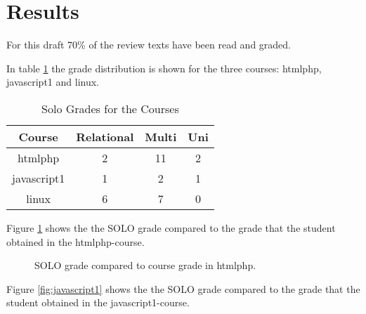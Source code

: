 \documentclass[twoside,twocolumn,a4paper,11pt,english]{article}
\begin{document}

\section{Results}

For this draft 70\% of the review texts have been read and graded.

In table \ref{table:solo} the grade distribution is shown for the three courses: htmlphp, javascript1 and linux.

\begin{table}[H]
\caption{Solo Grades for the Courses}
\centering
\begin{tabular}{c | c c c}
Course & Relational & Multi & Uni \\ [0.5ex] %
\hline
htmlphp & 2 & 11 & 2 \\
javascript1 & 1 & 2 & 1 \\
linux & 6 & 7 & 0 \\ [1ex]
\end{tabular}
\label{table:solo}
\end{table}

Figure \ref{fig:htmlphp} shows the the SOLO grade compared to the grade that the student obtained in the htmlphp-course.

\begin{figure}[H]
\label{fig:htmlphp}
\caption{SOLO grade compared to course grade in htmlphp.}
\end{figure}


Figure \ref{fig:javascript1} shows the the SOLO grade compared to the grade that the student obtained in the javascript1-course.
\end{document}

